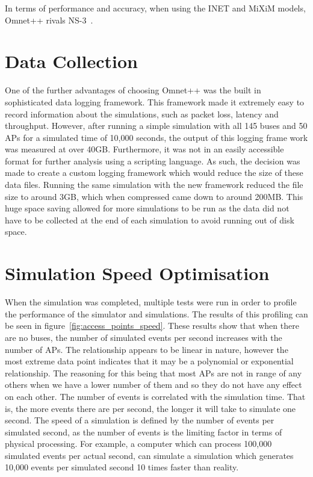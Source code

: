         In terms of performance and accuracy, when using the INET and MiXiM models, Omnet++ rivals NS-3~\cite{networksimulatorcomparison}.


    \section{Data Collection}\label{simulation_simulator_options_data_collection}

        One of the further advantages of choosing Omnet++ was the built in sophisticated data logging framework. This framework made it extremely easy to record information about the simulations, such as packet loss, latency and throughput. However, after running a simple simulation with all 145 buses and 50 APs for a simulated time of 10,000 seconds, the output of this logging frame work was measured at over 40GB. Furthermore, it was not in an easily accessible format for further analysis using a scripting language. As such, the decision was made to create a custom logging framework which would reduce the size of these data files. Running the same simulation with the new framework reduced the file size to around 3GB, which when compressed came down to around 200MB. This huge space saving allowed for more simulations to be run as the data did not have to be collected at the end of each simulation to avoid running out of disk space. 

    \section{Simulation Speed Optimisation}\label{simulation_simulator_options_simulation_speed_optimisation}

        When the simulation was completed, multiple tests were run in order to profile the performance of the simulator and simulations. The results of this profiling can be seen in figure~\ref{fig:access_points_speed}. These results show that when there are no buses, the number of simulated events per second increases with the number of APs. The relationship appears to be linear in nature, however the most extreme data point indicates that it may be a polynomial or exponential relationship. The reasoning for this being that most APs are not in range of any others when we have a lower number of them and so they do not have any effect on each other. The number of events is correlated with the simulation time. That is, the more events there are per second, the longer it will take to simulate one second. The speed of a simulation is defined by the number of events per simulated second, as the number of events is the limiting factor in terms of physical processing. For example, a computer which can process 100,000 simulated events per actual second, can simulate a simulation which generates 10,000 events per simulated second 10 times faster than reality. 

